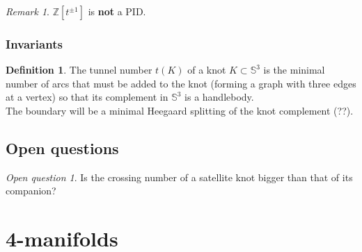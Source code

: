 \documentclass[a4paper]{book}
\theoremstyle{definition}
\newtheorem{definition}[theorem]{Definition}
\theoremstyle{remark}
\newtheorem{remark}[theorem]{Remark}
\newtheorem{openquestion}{Open question}
\newcommand{\sphere}[1]{\mathbb{S}^{#1}}
\newcommand{\Z}{\mathbb{Z}}
\begin{document}
\begin{remark}
	$\Z[t^{\pm 1}]$ is \textbf{not} a PID.
\end{remark}


\subsection{Invariants}

\begin{definition}
	The tunnel number $t(K)$ of a knot $K \subset \sphere{3}$ is the minimal number of arcs
	that must be added to the knot (forming a graph with three edges at a vertex) so that
	its complement in $\sphere{3}$ is a handlebody. \\
	The boundary will be a minimal Heegaard splitting of the knot complement (??).
\end{definition}



\section{Open questions}

\begin{openquestion}
	Is the crossing number of a satellite knot bigger than that of its companion?
\end{openquestion}
	
\chapter{4-manifolds}

{}


\printindex
\end{document}
